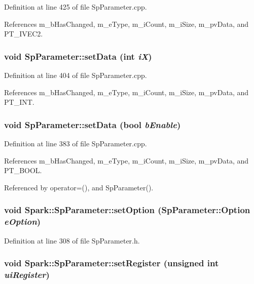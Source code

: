 Definition at line 425 of file Sp\-Parameter.cpp.

References m\_\-b\-Has\-Changed, m\_\-e\-Type, m\_\-i\-Count, m\_\-i\-Size, m\_\-pv\-Data, and PT\_\-IVEC2.
\subsubsection{\setlength{\rightskip}{0pt plus 5cm}void Sp\-Parameter::set\-Data (int {\em i\-X})}\label{classSpark_1_1SpParameter_a25}


Definition at line 404 of file Sp\-Parameter.cpp.

References m\_\-b\-Has\-Changed, m\_\-e\-Type, m\_\-i\-Count, m\_\-i\-Size, m\_\-pv\-Data, and PT\_\-INT.
\subsubsection{\setlength{\rightskip}{0pt plus 5cm}void Sp\-Parameter::set\-Data (bool {\em b\-Enable})}\label{classSpark_1_1SpParameter_a24}


Definition at line 383 of file Sp\-Parameter.cpp.

References m\_\-b\-Has\-Changed, m\_\-e\-Type, m\_\-i\-Count, m\_\-i\-Size, m\_\-pv\-Data, and PT\_\-BOOL.

Referenced by operator=(), and Sp\-Parameter().
\subsubsection{\setlength{\rightskip}{0pt plus 5cm}void Spark::Sp\-Parameter::set\-Option ({\bf Sp\-Parameter::Option} {\em e\-Option})\hspace{0.3cm}{\tt  [inline]}}\label{classSpark_1_1SpParameter_a20}


Definition at line 308 of file Sp\-Parameter.h.
\subsubsection{\setlength{\rightskip}{0pt plus 5cm}void Spark::Sp\-Parameter::set\-Register (unsigned int {\em ui\-Register})\hspace{0.3cm}{\tt  [inline]}}\label{classSpark_1_1SpParameter_a22}


